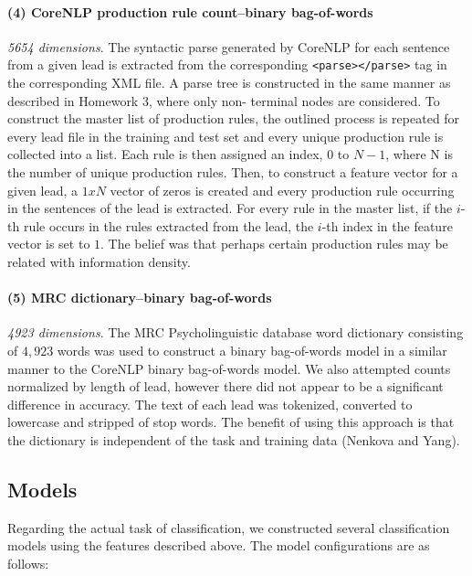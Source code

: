 \documentclass[
10pt, %
a4paper, %
oneside, %
headinclude,footinclude, %
BCOR5mm, %
]{scrartcl}
\begin{document}
\paragraph{\textbf{(4) CoreNLP production rule count--binary bag-of-words}}
\hfill \newline \noindent \textit{5654 dimensions}. The syntactic parse
generated by CoreNLP for each sentence from a given lead is extracted from the
corresponding \texttt{<parse></parse>} tag in the corresponding XML file. A
parse tree is constructed in the same manner as described in Homework 3, where
only non- terminal nodes are considered. To construct the master list of
production rules, the outlined process is repeated for every lead file in the
training and test set and every unique production rule is collected into a list.
Each rule is then assigned an index, $0$ to $N-1$, where N is the number of
unique production rules. Then, to construct a feature vector for a given lead, a
$1 x N$ vector of zeros is created and every production rule occurring in the
sentences of the lead is extracted. For every rule in the master list, if the
$i$-th rule occurs in the rules extracted from the lead, the $i$-th index in the
feature vector is set to $1$. The belief was that perhaps certain production
rules may be related with information density.

\paragraph{\textbf{(5) MRC dictionary--binary bag-of-words}}
\hfill \newline \noindent \textit{4923 dimensions}. 
The MRC Psycholinguistic database word dictionary consisting of $4,923$ words
was used to construct a binary bag-of-words model in a similar manner to the
CoreNLP binary bag-of-words model. We also attempted counts normalized by length
of lead, however there did not appear to be a significant difference in
accuracy. The text of each lead was tokenized, converted to lowercase and
stripped of stop words. The benefit of using this approach is that the
dictionary is independent of the task and training data (Nenkova and Yang).


\subsection{Models}
Regarding the actual task of classification, we constructed several 
classification models using the features described above. The model 
configurations are as follows:
\end{document}

